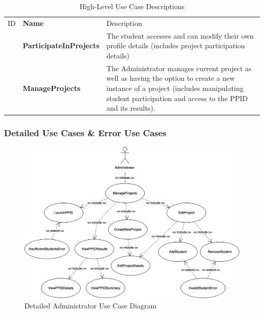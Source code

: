\documentclass[12pt,letterpaper]{article}
\begin{document}
\begin{table}[H]
	\caption{High-Level Use Case Descriptions}
	\vspace{1em}
	\begin{tabu} to 
	    \tableheader{}ID & Name & Description\\
		\participateinprojects{} & ParticipateInProjects & The student accesses and can modify their own profile details 
		(includes project participation details)\\
		\manageprojects{} & ManageProjects & The Administrator manages current project as well as having the option to 
		create a new instance of a project (includes manipulating student participation and access to the PPID and its results). \\
	\end{tabu}
\end{table}

\subsubsection*{Detailed Use Cases \& Error Use Cases}

\begin{figure}[H]
	\centering{}
	\includegraphics[scale=0.26]{imgs/detailed-administrator-use-case-diagram.png}
	\caption{Detailed Administrator Use Case Diagram}
\end{figure}
\end{document}

